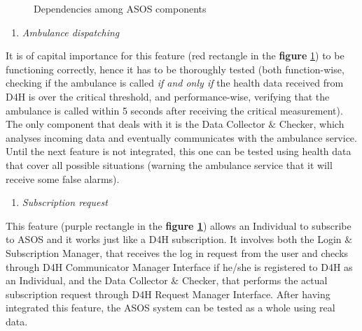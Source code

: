     \begin{figure}[h]
        \centering
        \caption{Dependencies among ASOS components}
        \label{fig:ASOS_DependencyDiagram}
    \end{figure}
    
    \begin{enumerate}
        \item \emph{Ambulance dispatching}
    \end{enumerate}
    It is of capital importance for this feature (red rectangle in the \textbf{figure} \ref{fig:ASOS_DependencyDiagram}) to be functioning correctly, hence it has to be thoroughly tested (both function-wise, checking if the ambulance is called \emph{if and only if} the health data received from D4H is over the critical threshold, and performance-wise, verifying that the ambulance is called within 5 seconds after receiving the critical measurement). The only component that deals with it is the Data Collector $\&$ Checker, which analyses incoming data and eventually communicates with the ambulance service. Until the next feature is not integrated, this one can be tested using health data that cover all possible situations (warning the ambulance service that it will receive some false alarms).
    
    \newpage
    \begin{enumerate} [resume]
        \item \emph{Subscription request}
    \end{enumerate}
    This feature (purple rectangle in the \textbf{figure \ref{fig:ASOS_DependencyDiagram}}) allows an Individual to subscribe to ASOS and it works just like a D4H subscription. It involves both the Login $\&$ Subscription Manager, that receives the log in request from the user and checks through D4H Communicator Manager Interface if he/she is registered to D4H as an Individual, and the Data Collector $\&$ Checker, that performs the actual subscription request through D4H Request Manager Interface. After having integrated this feature, the ASOS system can be tested as a whole using real data.

